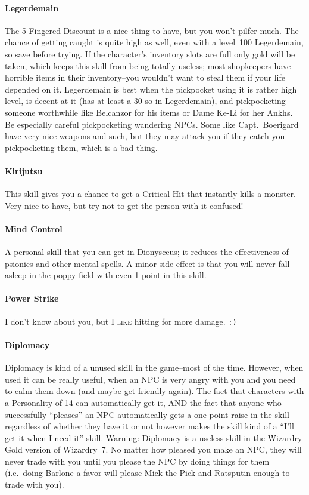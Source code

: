 \documentclass[12pt]{article}
\let\oldparagraph\paragraph
\renewcommand{\paragraph}[1]{\oldparagraph{#1}\mbox{}}
\newcommand{\indexPlace}[1]{\index{#1}}
\newcommand{\place}[1]{#1\indexPlace{#1}}
\begin{document}
\paragraph{Legerdemain} The 5 Fingered Discount is a nice thing to have, but
you won't pilfer much. The chance of getting caught is quite high as well,
even with a level~100 Legerdemain, so save before trying. If the character's
inventory slots are full only gold will be taken, which keeps this skill from
being totally useless; most shopkeepers have horrible items in their
inventory--you wouldn't want to steal them if your life depended on
it. Legerdemain is best when the pickpocket using it is rather high level, is
decent at it (has at least a 30 so in Legerdemain), and pickpocketing someone
worthwhile like Belcanzor for his items or Dame Ke-Li for her Ankhs. Be
especially careful pickpocketing wandering NPCs. Some like Capt.~Boerigard
have very nice weapons and such, but they may attack you if they catch you
pickpocketing them, which is a bad thing.

\paragraph{Kirijutsu} This skill gives you a chance to get a Critical Hit
that instantly kills a monster. Very nice to have, but try not to get the
person with it confused!

\paragraph{Mind Control} A personal skill that you can get in
\place{Dionysceus}; it reduces the effectiveness of psionics and other mental
spells. A minor side effect is that you will never fall asleep in the poppy
field with even 1 point in this skill.

\paragraph{Power Strike} I don't know about you, but I \textsc{like} hitting
for more damage. \texttt{:)}

\paragraph{Diplomacy} Diplomacy is kind of a unused skill in the game--most
of the time. However, when used it can be really useful, when an NPC is very
angry with you and you need to calm them down (and maybe get friendly
again). The fact that characters with a Personality of 14 can automatically
get it, AND the fact that anyone who successfully ``pleases'' an NPC
automatically gets a one point raise in the skill regardless of whether they
have it or not however makes the skill kind of a ``I'll get it when I need
it'' skill. Warning: Diplomacy is a useless skill in the Wizardry Gold
version of Wizardry~7. No matter how pleased you make an NPC, they will never
trade with you until you please the NPC by doing things for them (i.e.~doing
Barlone a favor will please Mick the Pick and Ratsputin enough to trade with
you).
\end{document}
